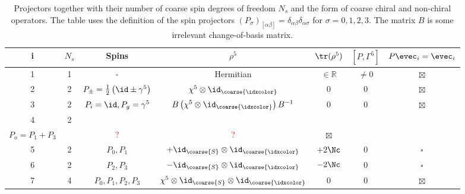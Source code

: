 \begin{table}
\begin{tabular}{c|cccccc}
\toprule
i & $N_s$ & Spins & $\rho^{5}$ & $\tr(\rho^{5})$ & $[P, \Gamma^{5}]$ & $P\evec_i = \evec_i$ \\
\midrule
1 & 1 & - & Hermitian & $\in \mathbb{R}$ & $\neq 0$ & $\boxtimes$ \\
\midrule
2 & 2 & $P_{\pm} = \frac{1}{2} \left( \id \pm \gamma^{5} \right)$ & $\chi^{5} \otimes \id_{\coarse{\idxcolor}}$ & $0$ & $0$ & $\boxtimes$ \\
\midrule
3 & 2 & $P_i = \id, P_g = \gamma^{5}$ & $B \left(\chi^{5} \otimes \id_{\coarse{\idxcolor}} \right) B^{-1}$ & $0$  & $0$ & $\boxtimes$ \\
\midrule
4 & 2 &
\makecell{
	$P_{e} = P_0 + P_2$, \\
	$P_{o} = P_1 + P_3$
}
& \worktodo{?} & \textcolor{red}{?} & \textcolor{red}{?} & $\boxtimes$ \\
\midrule
5 & 2 & $P_0, P_1$ & $+\id_{\coarse{S}} \otimes \id_{\coarse{\idxcolor}}$ & $+2 \Nc$ & $0$ & $\square$ \\
\midrule
6 & 2 & $P_2, P_3$ & $-\id_{\coarse{S}} \otimes \id_{\coarse{\idxcolor}}$ & $-2 \Nc$ & $0$ & $\square$ \\
\midrule
7 & 4 & $P_0, P_1, P_2, P_3$ & $\chi^{5} \otimes \id_{\coarse{S}} \otimes \id_{\coarse{\idxcolor}}$ & $0$ & $0$ & $\boxtimes$ \\
\bottomrule
\end{tabular}
\caption{\label{tab:spins}
Projectors together with their number of coarse spin degrees of freedom $N_s$ and the form of coarse chiral and non-chiral operators. The table uses the definition of the spin projectors $(P_{\sigma})_{[\alpha \beta]} = \delta_{\alpha \beta} \delta_{\alpha \sigma}$ for $\sigma=0,1,2,3$. The matrix $B$ is some irrelevant change-of-basis matrix.
}
\end{table}

